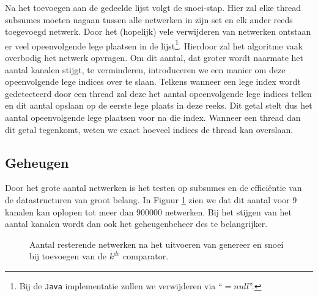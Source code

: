 \documentclass{article}
\begin{document}
Na het toevoegen aan de gedeelde lijst volgt de snoei-stap. Hier zal elke thread subsumes moeten nagaan tussen alle netwerken in zijn set en elk ander reeds toegevoegd netwerk.
Door het (hopelijk) vele verwijderen van netwerken ontstaan er veel opeenvolgende lege plaatsen in de lijst\footnote{Bij de \texttt{Java} implementatie zullen we verwijderen via  ``${= null}$''.}.
Hierdoor zal het algoritme vaak overbodig het netwerk opvragen.
Om dit aantal, dat groter wordt naarmate het aantal kanalen stijgt, te verminderen, introduceren we een manier om deze opeenvolgende lege indices over te slaan. 
Telkens wanneer een lege index wordt gedetecteerd door een thread zal deze het aantal opeenvolgende lege indices tellen en dit aantal opslaan op de eerste lege plaats in deze reeks.
Dit getal stelt dus het aantal opeenvolgende lege plaatsen voor na die index.
Wanneer een thread dan dit getal tegenkomt, weten we exact hoeveel indices de thread kan overslaan.

\subsection{Geheugen}\label{Geheugen}
Door het grote aantal netwerken is het testen op subsumes en de effici\"entie van de datastructuren van groot belang. In Figuur \ref{netwerkVerloop9kanalen} zien we dat dit aantal voor $9$ kanalen kan oplopen tot meer dan $900000$ netwerken. Bij het stijgen van het aantal kanalen wordt dan ook het geheugenbeheer des te belangrijker.
\begin{figure}[!h]
	\centering
	\caption{Aantal resterende netwerken na het uitvoeren van genereer en snoei bij toevoegen van de $k^{de}$ comparator.}
	\label{netwerkVerloop9kanalen}
\end{figure}
\end{document}
